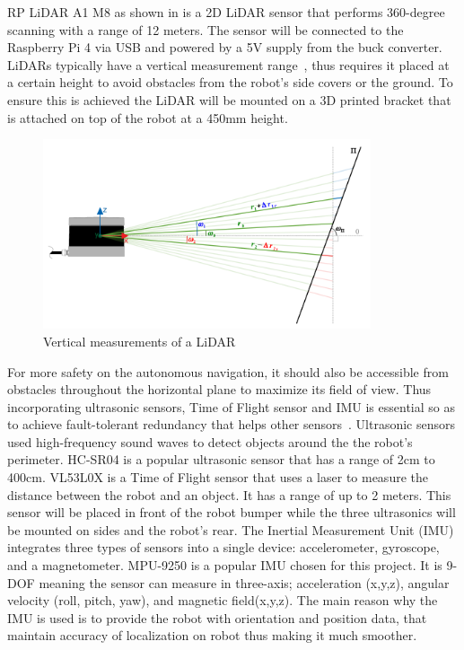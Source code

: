 \noindent RP LiDAR A1 M8 as shown in  is a 2D LiDAR sensor that performs 360-degree scanning with a range of 12 meters.
The sensor will be connected to the Raspberry Pi 4 via USB and powered by a 5V supply from the buck converter. LiDARs typically have a vertical measurement range~\cite{azevedo2018lidar}, thus requires it
placed at a certain height to avoid obstacles from the robot's side covers or the ground. To ensure this is achieved the LiDAR will be mounted on a 3D printed bracket that is attached on top of the robot at a 
450mm height.

\vspace{1.0em}
\begin{figure}[H]
    \centering
    \includegraphics[width=3.8in]{pics/vertical.png}
    \caption[Vertical measurement of a LiDAR]{Vertical measurements of a LiDAR~\cite{azevedo2018lidar}}\label{vert}
\end{figure} 


\noindent For more safety on the autonomous navigation, it should also be accessible from obstacles throughout the horizontal plane to maximize its field of view. 
Thus incorporating ultrasonic sensors, Time of Flight sensor and IMU is essential so as to achieve fault-tolerant redundancy that helps other sensors~\cite{CANADASARANEGA2024100606}.
Ultrasonic sensors used high-frequency sound waves to detect objects around the the robot's perimeter. HC-SR04 is a popular ultrasonic sensor that has a range of 2cm to 400cm.
VL53L0X is a Time of Flight sensor that uses a laser to measure the distance between the robot and an object. It has a range of up to 2 meters. This sensor will be placed 
in front of the robot bumper while the three ultrasonics will be mounted on sides and the robot's rear. The Inertial Measurement Unit (IMU) integrates three types of sensors into a single
device: accelerometer, gyroscope, and a magnetometer. MPU-9250 is a popular IMU chosen for this project. It is 9-DOF meaning the sensor can measure in three-axis; acceleration (x,y,z), angular velocity (roll, pitch, yaw), and magnetic field(x,y,z).
The main reason why the IMU is used is to provide the robot with orientation and position data, that maintain accuracy of localization on robot thus making it much smoother.


